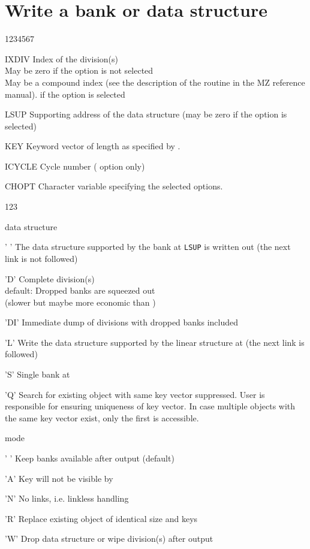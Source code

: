 \section{Write a bank or data structure}
\Idesc
\begin{DLtt}{1234567}
  \item[IXDIV]Index of the division(s)\\
    May be zero if the  option is not selected\\
    May be a compound index
    (see the description of the routine  in the MZ reference
    manual).
    if the  option is selected
  \item[LSUP]Supporting address
    of the data structure (may be zero if the  option is selected)
  \item[KEY]Keyword vector of length  as specified by .
  \item[ICYCLE]Cycle number ( option only)
  \item[CHOPT]Character variable specifying the selected options.
  \begin{DLtt}{123}
    \item[{\rm data structure}] \mbox{ } 
    \begin{DLtt}{12}
      \item[' ']The data structure supported by the bank at
        {\tt LSUP} is written out (the next link is not followed)
      \item['D']Complete division(s)\\
        default: Dropped banks are squeezed out\\
        \phantom{default: }(slower but maybe more economic than )
      \item['DI']Immediate dump of divisions with dropped banks included
      \item['L']Write the data structure supported by the linear structure
        at  (the next link is followed)
      \item['S']Single bank at 
      \item['Q']Search for existing object with same key vector suppressed.
      User is responsible for ensuring uniqueness of key vector. In case
      multiple objects with the same key vector exist, only the first is 
      accessible. 
    \end{DLtt}
    \item[{\rm mode}] \mbox{ }
    \begin{DLtt}{12}
      \item[' ']Keep banks available after output (default)
      \item['A']Key will not be visible by 
      \item['N']No links, i.e. linkless handling
      \item['R']Replace existing object of identical size and keys
      \item['W']Drop data structure or wipe division(s) after output
    \end{DLtt}
  \end{DLtt}
\end{DLtt}

